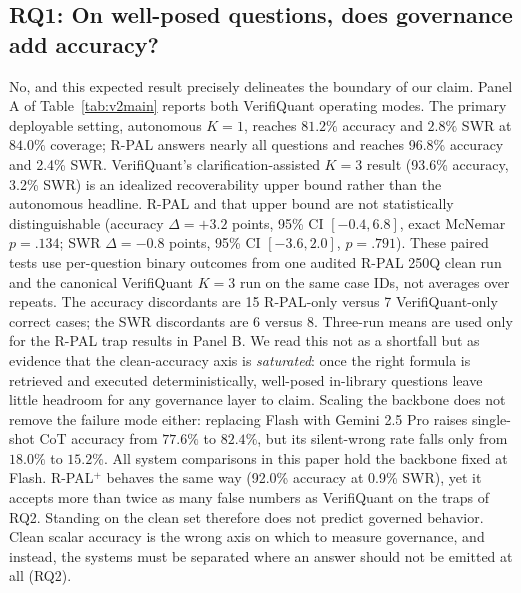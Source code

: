 \documentclass[sigconf,anonymous]{acmart}
\newcommand{\vqAccAll}{93.6\%}
\newcommand{\vqSWRAll}{3.2\%}
\newcommand{\rpalAccAll}{96.8\%}
\newcommand{\rpalSWRAll}{2.4\%}
\newcommand{\govPromptAccAll}{92.0\%}
\newcommand{\govPromptSWRAll}{0.9\%}
\begin{document}
\subsection{RQ1: On well-posed questions, does governance add accuracy?}
No, and this expected result precisely delineates the boundary of our claim.
Panel A of Table~\ref{tab:v2main} reports both VerifiQuant operating modes. The primary deployable setting, autonomous $K{=}1$, reaches $81.2\%$ accuracy and $2.8\%$ SWR at $84.0\%$ coverage; R-PAL answers nearly all questions and reaches \rpalAccAll{} accuracy and \rpalSWRAll{} SWR. VerifiQuant's clarification-assisted $K{=}3$ result (\vqAccAll{} accuracy, \vqSWRAll{} SWR) is an idealized recoverability upper bound rather than the autonomous headline. R-PAL and that upper bound are not statistically distinguishable (accuracy $\Delta{=}{+}3.2$ points, 95\% CI $[-0.4, 6.8]$, exact McNemar $p{=}.134$; SWR $\Delta{=}{-}0.8$ points, 95\% CI $[-3.6, 2.0]$, $p{=}.791$). These paired tests use per-question binary outcomes from one audited R-PAL 250Q clean run and the canonical VerifiQuant $K{=}3$ run on the same case IDs, not averages over repeats. The accuracy discordants are 15 R-PAL-only versus 7 VerifiQuant-only correct cases; the SWR discordants are 6 versus 8. Three-run means are used only for the R-PAL trap results in Panel B.
We read this not as a shortfall but as evidence that the clean-accuracy axis is \emph{saturated}: once the right formula is retrieved and executed deterministically, well-posed in-library questions leave little headroom for any governance layer to claim.
Scaling the backbone does not remove the failure mode either: replacing Flash with Gemini 2.5 Pro raises single-shot CoT accuracy from $77.6\%$ to $82.4\%$, but its silent-wrong rate falls only from $18.0\%$ to $15.2\%$. All system comparisons in this paper hold the backbone fixed at Flash.
R-PAL$^{+}$ behaves the same way (\govPromptAccAll{} accuracy at \govPromptSWRAll{} SWR), yet it accepts more than twice as many false numbers as VerifiQuant on the traps of RQ2. Standing on the clean set therefore does not predict governed behavior.
Clean scalar accuracy is the wrong axis on which to measure governance, and instead, the systems must be separated where an answer should not be emitted at all (RQ2).
\end{document}
